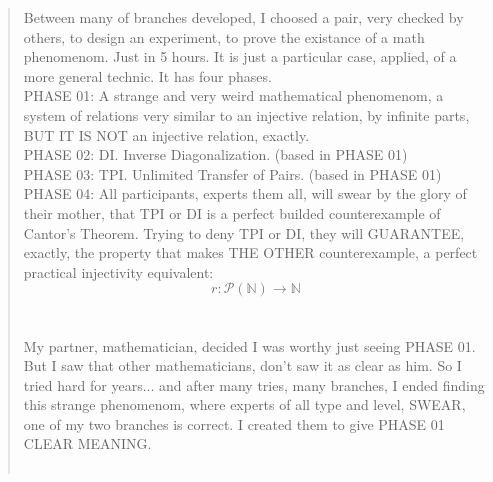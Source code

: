 \begin{abstract}
	
	\noindent
	Between many of branches developed, I choosed a pair, very checked by others, to design an experiment, to prove the existance of a math phenomenom. Just in 5 hours. It is just a particular case, applied, of a more general technic. It has four phases.
	\\
	
	\noindent
	PHASE 01: A strange and very weird mathematical phenomenom, a system of relations very similar to an injective relation, by infinite parts, BUT IT IS NOT an injective relation, exactly.
	\\
	
	\noindent
	PHASE 02: DI. Inverse Diagonalization. (based in PHASE 01)
	\\
	
	\noindent
	PHASE 03: TPI. Unlimited Transfer of Pairs. (based in PHASE 01)
	\\
	
	\noindent
	PHASE 04: All participants, experts them all, will swear by the glory of their mother, that TPI or DI is a perfect builded counterexample of Cantor's Theorem. Trying to deny TPI or DI, they will GUARANTEE, exactly, the property that makes THE OTHER counterexample, a perfect practical injectivity equivalent:
	$$ r: \mathcal{P}(\mathbb{N}) \longrightarrow \mathbb{N}  $$
	\\\\
	
	\noindent
	My partner, mathematician, decided I was worthy just seeing PHASE 01. But I saw that other mathematicians, don't saw it as clear as him. So I tried hard for years...  and after many tries, many branches, I ended finding this strange phenomenom, where experts of all type and level, SWEAR, one of my two branches is correct. I created them to give PHASE 01 CLEAR MEANING.
	\\\\
	
	

\end{abstract}
